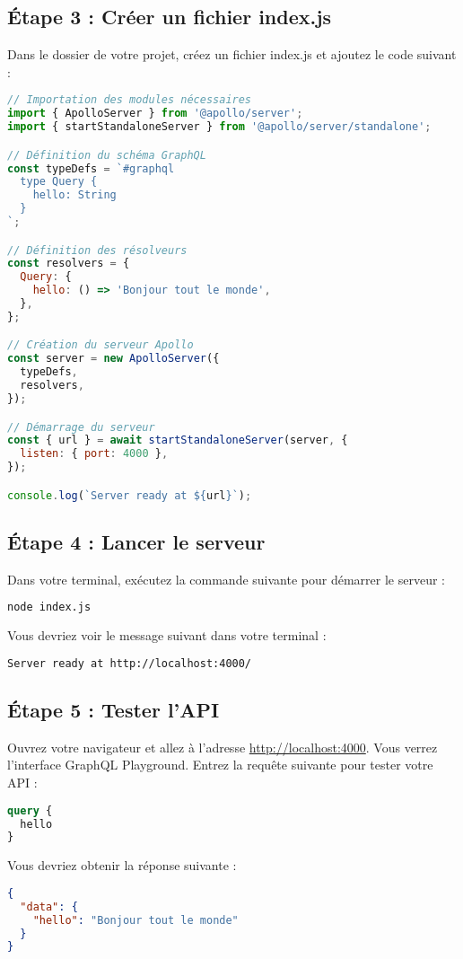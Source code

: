 \documentclass{article}
\begin{document}
\subsection{Étape 3 : Créer un fichier index.js}
Dans le dossier de votre projet, créez un fichier index.js et ajoutez le code suivant :
\begin{lstlisting}[language=JavaScript]
// Importation des modules nécessaires
import { ApolloServer } from '@apollo/server';
import { startStandaloneServer } from '@apollo/server/standalone';

// Définition du schéma GraphQL
const typeDefs = `#graphql
  type Query {
    hello: String
  }
`;

// Définition des résolveurs
const resolvers = {
  Query: {
    hello: () => 'Bonjour tout le monde',
  },
};

// Création du serveur Apollo
const server = new ApolloServer({
  typeDefs,
  resolvers,
});

// Démarrage du serveur
const { url } = await startStandaloneServer(server, {
  listen: { port: 4000 },
});

console.log(`Server ready at ${url}`);
\end{lstlisting}

\subsection{Étape 4 : Lancer le serveur}
Dans votre terminal, exécutez la commande suivante pour démarrer le serveur :
\begin{lstlisting}[language=bash]
node index.js
\end{lstlisting}

Vous devriez voir le message suivant dans votre terminal :
\begin{lstlisting}[language=bash]
Server ready at http://localhost:4000/
\end{lstlisting}

\subsection{Étape 5 : Tester l'API}
Ouvrez votre navigateur et allez à l'adresse \url{http://localhost:4000}. Vous verrez l'interface GraphQL Playground. Entrez la requête suivante pour tester votre API :
\begin{lstlisting}[language=GraphQL]
query {
  hello
}
\end{lstlisting}

Vous devriez obtenir la réponse suivante :
\begin{lstlisting}[language=JSON]
{
  "data": {
    "hello": "Bonjour tout le monde"
  }
}
\end{lstlisting}
\end{document}
